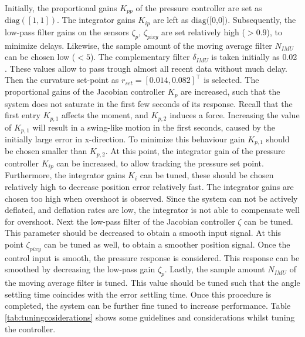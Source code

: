 Initially, the proportional gains $K_{pp}$ of the pressure controller are set as $\text{diag}([1,1])$. The integrator gains $K_{ip}$ are left as $\text{diag([0,0])}$. Subsequently, the low-pass filter gains on the sensors $\zeta_p$, $\zeta_{pixy}$ are set relatively high ($>0.9$), to minimize delays. Likewise, the sample amount of the moving average filter $N_{IMU}$ can be chosen low ($<5$). The complementary filter $\delta_{IMU}$ is taken initially as 0.02 \cite{compfilter}. These values allow to pass trough almost all recent data without much delay. Then the curvature set-point as $r_{set} = [0.014,0.082]^\top$ is selected. The proportional gains of the Jacobian controller $K_p$ are increased, such that the system does not saturate in the first few seconds of its response. Recall that the first entry $K_{p,1}$ affects the moment, and $K_{p,2}$ induces a force. Increasing the value of $K_{p,1}$ will result in a swing-like motion in the first seconds, caused by the initially large error in x-direction. To minimize this behaviour gain $K_{p,1}$ should be chosen smaller than $K_{p,2}$. At this point, the integrator gain of the pressure controller $K_{ip}$ can be increased, to allow tracking the pressure set point. Furthermore, the integrator gains $K_i$ can be tuned, these should be chosen relatively high to decrease position error relatively fast. The integrator gains are chosen too high when overshoot is observed. Since the system can not be actively deflated, and deflation rates are low, the integrator is not able to compensate well for overshoot. Next the low-pass filter of the Jacobian controller $\zeta$ can be tuned. This parameter should be decreased to obtain a smooth input signal. At this point $\zeta_{pixy}$ can be tuned as well, to obtain a smoother position signal. Once the control input is smooth, the pressure response is considered. This response can be smoothed by decreasing the low-pass gain $\zeta_p$. Lastly, the sample amount $N_{IMU}$ of the moving average filter is tuned. This value should be tuned such that the angle settling time coincides with the error settling time. Once this procedure is completed, the system can be further fine tuned to increase performance. Table \ref{tab:tuningcosiderations} shows some guidelines and considerations whilst tuning the controller.


